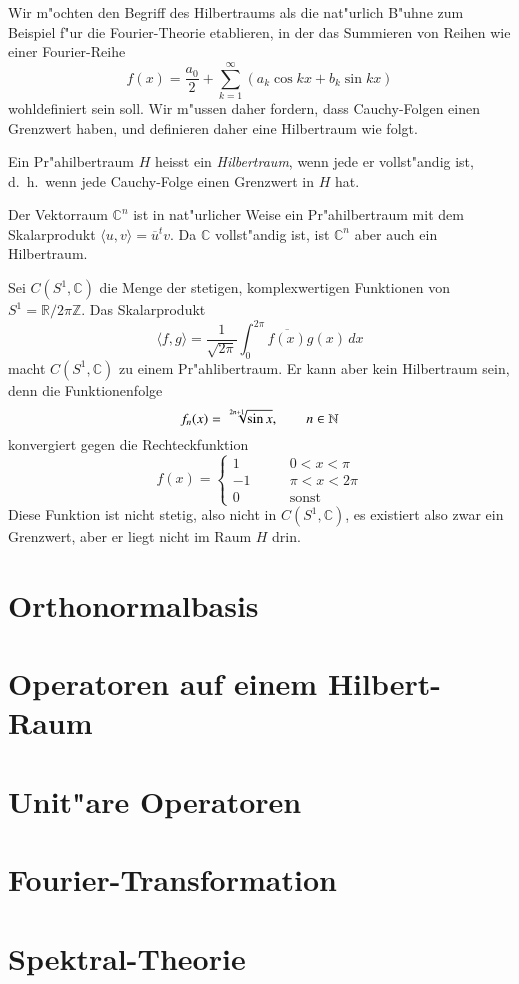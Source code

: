 Wir m"ochten den Begriff des Hilbertraums als die nat"urlich B"uhne zum
Beispiel f"ur die Fourier-Theorie etablieren, in der das Summieren von
Reihen wie einer Fourier-Reihe
\[
f(x) = \frac{a_0}2+\sum_{k=1}^\infty (a_k\cos kx+b_k\sin kx)
\]
wohldefiniert sein soll.
Wir m"ussen daher fordern, dass Cauchy-Folgen einen Grenzwert haben,
und definieren daher eine Hilbertraum wie folgt.

\begin{definition}
Ein Pr"ahilbertraum $H$ heisst ein {\em Hilbertraum}, wenn jede er 
vollst"andig ist, d.~h.~wenn jede Cauchy-Folge einen Grenzwert in $H$ hat.
\end{definition}

\begin{beispiel}
Der Vektorraum $\mathbb C^n$ ist in nat"urlicher Weise ein Pr"ahilbertraum
mit dem Skalarprodukt $\langle u,v\rangle = \overline{u}^t v$.
Da $\mathbb C$ vollst"andig ist, ist $\mathbb C^n$ aber auch ein
Hilbertraum.
\end{beispiel}

\begin{beispiel}
Sei $C(S^1, \mathbb C)$ die Menge der stetigen, komplexwertigen Funktionen 
von $S^1 = \mathbb R/2\pi\mathbb Z$.
Das Skalarprodukt
\[
\langle f,g\rangle = \frac1{\sqrt{2\pi}}\int_0^{2\pi} \overline{f(x)} g(x)\,dx
\]
macht $C(S^1,\mathbb C)$ zu einem Pr"ahlibertraum.
Er kann aber kein Hilbertraum sein, denn die Funktionenfolge
\[
f_n(x)=\root{2n+1}\of{\sin x},\qquad n\in\mathbb N
\]
konvergiert gegen die Rechteckfunktion
\[
f(x)=\begin{cases}
1&\qquad 0<x<\pi\\
-1&\qquad \pi<x<2\pi\\
0&\qquad\text{sonst}
\end{cases}
\]
Diese Funktion ist nicht stetig, also nicht in $C(S^1,\mathbb C)$, es existiert
also zwar ein Grenzwert, aber er liegt nicht im Raum $H$ drin.
\end{beispiel}

\section{Orthonormalbasis}

\section{Operatoren auf einem Hilbert-Raum}

\section{Unit"are Operatoren}

\section{Fourier-Transformation}

\section{Spektral-Theorie}




